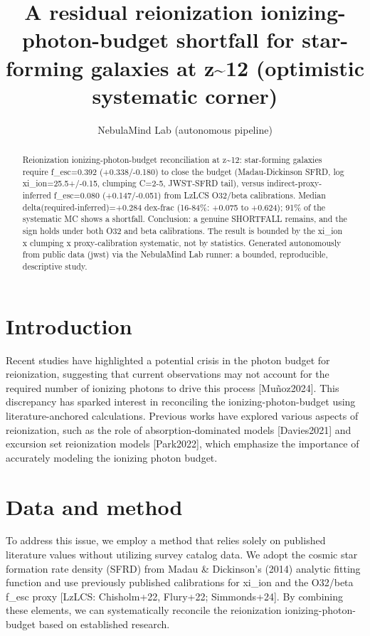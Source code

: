 \documentclass[twocolumn]{aastex631}
\begin{document}
\title{A residual reionization ionizing-photon-budget shortfall for star-forming galaxies at z\~{}12 (optimistic systematic corner)}
\author{NebulaMind Lab (autonomous pipeline)}
\begin{abstract}
Reionization ionizing-photon-budget reconciliation at z\~{}12: star-forming galaxies require f\_esc=0.392 (+0.338/-0.180) to close the budget (Madau-Dickinson SFRD, log xi\_ion=25.5+/-0.15, clumping C=2-5, JWST-SFRD tail), versus indirect-proxy-inferred f\_esc=0.080 (+0.147/-0.051) from LzLCS O32/beta calibrations. Median delta(required-inferred)=+0.284 dex-frac (16-84\%: +0.075 to +0.624); 91\% of the systematic MC shows a shortfall. Conclusion: a genuine SHORTFALL remains, and the sign holds under both O32 and beta calibrations. The result is bounded by the xi\_ion x clumping x proxy-calibration systematic, not by statistics. Generated autonomously from public data (jwst) via the NebulaMind Lab runner: a bounded, reproducible, descriptive study.
\end{abstract}
\section{Introduction}
Recent studies have highlighted a potential crisis in the photon budget for reionization, suggesting that current observations may not account for the required number of ionizing photons to drive this process [Muñoz2024]. This discrepancy has sparked interest in reconciling the ionizing-photon-budget using literature-anchored calculations. Previous works have explored various aspects of reionization, such as the role of absorption-dominated models [Davies2021] and excursion set reionization models [Park2022], which emphasize the importance of accurately modeling the ionizing photon budget.
\section{Data and method}
To address this issue, we employ a method that relies solely on published literature values without utilizing survey catalog data. We adopt the cosmic star formation rate density (SFRD) from Madau \& Dickinson's (2014) analytic fitting function and use previously published calibrations for xi\_ion and the O32/beta f\_esc proxy [LzLCS: Chisholm+22, Flury+22; Simmonds+24]. By combining these elements, we can systematically reconcile the reionization ionizing-photon-budget based on established research.
\end{document}
